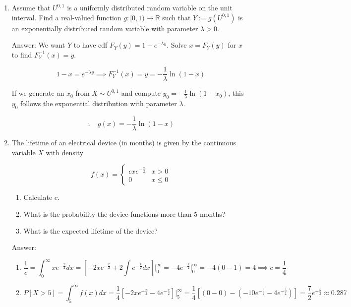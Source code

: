 \documentclass{article}
\begin{document}
\begin{enumerate}
\item

Assume that $U^{0,1}$ is a uniformly distributed random variable on the unit interval. Find a real-valued function $g: [0,1) \rightarrow \mathbb{R}$ such that $Y := g(U^{0,1})$ is an exponentially distributed random variable with parameter $\lambda > 0$. 

Answer: We want $Y$ to have cdf $F_Y(y) = 1 - e^{-\lambda y}$. Solve $x = F_Y(y)$ for $x$ to find $F_Y^{-1}(x) = y$. 

$$
1 - x = e^{- \lambda y} \implies
F_Y^{-1}(x) = y = - \frac{1}{\lambda}\ln (1-x)
$$

If we generate an $x_0$ from $X \sim U^{0,1}$ and compute $y_0 = - \frac{1}{\lambda}\ln (1-x_0)$, this $y_0$ follows the exponential distribution with parameter $\lambda$. 

$$
\boxed{ \therefore \quad g(x) = - \frac{1}{\lambda}\ln (1-x)}
$$

\newpage
\item

The lifetime of an electrical device (in months) is given by the continuous variable $X$ with density 

$$
f(x) = \begin{cases}
cxe^{-\frac{x}{2}} & x > 0 \\
0 & x \leq 0
\end{cases}
$$

\begin{enumerate}
\item Calculate $c$.

\item What is the probability the device functions more than 5 months?

\item What is the expected lifetime of the device?
\end{enumerate}

Answer:

\begin{enumerate}
\item

$$
\frac{1}{c} = \int_0^\infty xe^{-\frac{x}{2}} dx 
= \left[-2xe^{-\frac{x}{2}} + 2\int e^{-\frac{x}{2}} dx \right] \biggr\vert_0^\infty 
= -4e^{- \frac{x}{2}}\biggr \vert_0^\infty 
= -4(0-1) 
= 4 \implies \boxed{c = \frac{1}{4}} 
$$

\item 

$$
P[X > 5] = \int_5^\infty f(x) dx = \frac{1}{4}\left[-2xe^{-\frac{x}{2}} - 4e^{-\frac{x}{2}}\right] \biggr \vert_5^\infty = \frac{1}{4}[(0-0) - (-10e^{-\frac{5}{2}} - 4e^{-\frac{5}{2}})] = \boxed{\frac{7}{2}e^{-\frac{5}{2}} \approx 0.287}
$$


\end{enumerate}
\end{enumerate}
\end{document}
